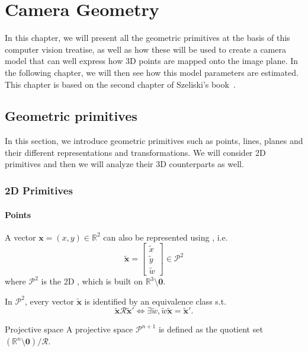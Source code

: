 \chapter{Camera Geometry}

In this chapter, we will present all the geometric primitives at the basis of this computer vision treatise, as well as how these will be used to create a camera model that can well express how 3D points are mapped onto the image plane.
In the following chapter, we will then see how this model parameters are estimated. This chapter is based on the second chapter of Szeliski's book~\cite{szeliski}.

\section{Geometric primitives}
In this section, we introduce geometric primitives such as points, lines, planes and their different representations and transformations.
We will consider 2D primitives and then we will analyze their 3D counterparts as well.

\subsection{2D Primitives}

\subsubsection{Points}
A vector $\mathbf{x}=(x,y)\in \mathbb{R}^2$ can also be represented using , i.e.
$$\tilde{\mathbf{x}}=\begin{bmatrix}
\tilde{x} \\
\tilde{y} \\
\tilde{w}
\end{bmatrix}
\in \mathcal{P}^2$$
where $\mathcal{P}^2$ is the 2D , which is built on $\mathbb{R}^3\setminus \mathbf{0}$.

In $\mathcal{P}^2$, every vector $\tilde{\mathbf{x}}$ is identified by an equivalence class s.t. $$\tilde{\mathbf{x}}\mathcal{R}\tilde{\mathbf{x}}' \iff \exists \tilde{w},\tilde{w}\tilde{\mathbf{x}}=\tilde{\mathbf{x}}'.$$

\begin{definition}{Projective space}
    A projective space $\mathcal{P}^{n+1}$ is defined as the quotient set $(\mathbb{R}^n\setminus \mathbf{0}) / \mathcal{R}$.
\end{definition}

